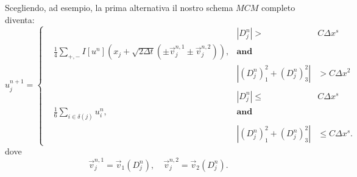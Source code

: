 Scegliendo, ad esempio, la prima alternativa il nostro schema $\mathit{MCM}$ completo diventa:
\begin{equation}
  \label{eq:mcm-schema}
  u_j^{n+1}=
  \left\{
  \begin{aligned}
    &   &\scriptstyle|D_j^n|>&\scriptstyle C\Delta x^s\\ 
    &\frac{1}{4}\sum_{+,-}I[u^n](x_j+\sqrt{2\Delta t}(\pm\vec{v}_{j}^{n,1}\pm\vec{v}_{j}^{n,2})),  &\scriptstyle\mathbf{and} \\
    &  &\scriptstyle|(D_j^n)_1^2+(D_j^n)_3^2|&\scriptstyle >C\Delta x^2 \\
    &  &  \\
    &  &\scriptstyle|D_j^n|\leq&\scriptstyle C\Delta x^s \\
     & \frac{1}{6}\sum_{i\in\delta(j)}u_i^n,   &\scriptstyle\mathbf{and} \\
  &  &\scriptstyle|(D_j^n)_1^2+(D_j^n)_3^2| &\scriptstyle\leq C\Delta x^s.
  \end{aligned}   
  \right.
\end{equation}
dove
\begin{equation} 
  \label{eq:cp3-sc3-1-end}
  \vec{v}_{j}^{n,1}=\vec{v}_1(D_j^n), \quad\vec{v}_j^{n,2}=\vec{v}_2(D_j^n).
\end{equation} 

%
